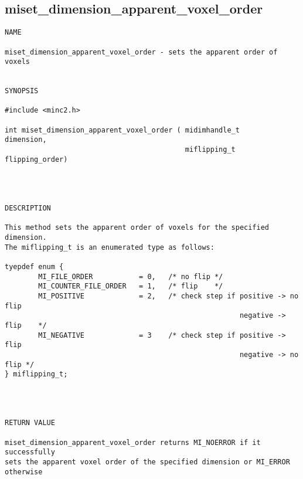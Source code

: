 \documentclass{article}
\begin{document}
\subsection{miset\_dimension\_apparent\_voxel\_order}
\begin{verbatim}
NAME 

miset_dimension_apparent_voxel_order - sets the apparent order of voxels


SYNOPSIS

#include <minc2.h>

int miset_dimension_apparent_voxel_order ( midimhandle_t        dimension,
                                           miflipping_t         flipping_order)




DESCRIPTION

This method sets the apparent order of voxels for the specified dimension.
The miflipping_t is an enumerated type as follows:

tyepdef enum {
        MI_FILE_ORDER           = 0,   /* no flip */
        MI_COUNTER_FILE_ORDER   = 1,   /* flip    */
        MI_POSITIVE             = 2,   /* check step if positive -> no flip
                                                        negative -> flip    */
        MI_NEGATIVE             = 3    /* check step if positive -> flip
                                                        negative -> no flip */
} miflipping_t;




RETURN VALUE

miset_dimension_apparent_voxel_order returns MI_NOERROR if it successfully
sets the apparent voxel order of the specified dimension or MI_ERROR otherwise
\end{verbatim}
\end{document}
